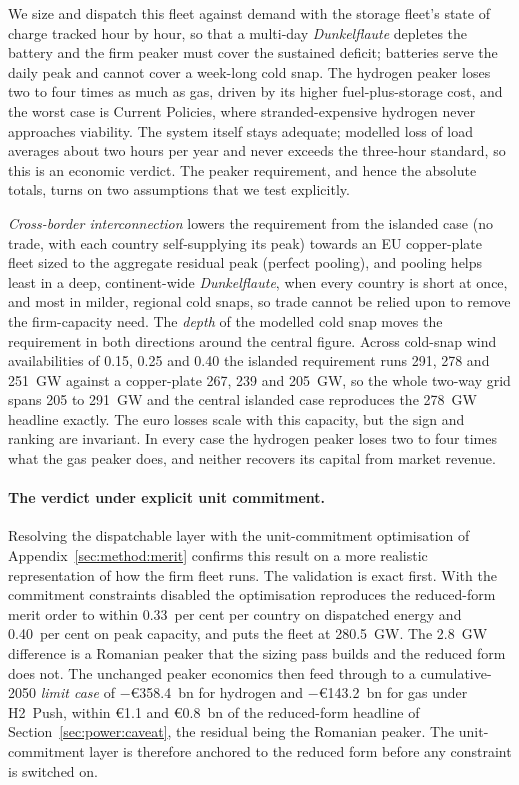 We size and dispatch this fleet against demand with the storage fleet's state of charge
tracked hour by hour, so that a multi-day \emph{Dunkelflaute} depletes the battery and
the firm peaker must cover the sustained deficit; batteries serve the daily peak and
cannot cover a week-long cold snap. The hydrogen peaker loses two to four times as much
as gas, driven by its higher fuel-plus-storage cost, and the worst case is Current
Policies, where stranded-expensive hydrogen never approaches viability. The system
itself stays adequate; modelled loss of load averages about two hours per year and never
exceeds the three-hour standard, so this is an economic verdict. The peaker requirement,
and hence the absolute totals, turns on two assumptions that we test explicitly.

\emph{Cross-border interconnection} lowers the requirement from the islanded case (no
trade, with each country self-supplying its peak) towards an EU copper-plate fleet sized
to the aggregate residual peak (perfect pooling), and pooling helps least in a deep,
continent-wide \emph{Dunkelflaute}, when every country is short at once, and most in
milder, regional cold snaps, so trade cannot be relied upon to remove the firm-capacity
need. The \emph{depth} of the modelled cold snap moves the requirement in both
directions around the central figure. Across cold-snap wind availabilities of 0.15, 0.25
and 0.40 the islanded requirement runs 291, 278 and 251~GW against a copper-plate 267,
239 and 205~GW, so the whole two-way grid spans 205 to 291~GW and the central islanded
case reproduces the 278~GW headline exactly. The euro losses scale with this capacity,
but the sign and ranking are invariant. In every case the hydrogen peaker loses two to
four times what the gas peaker does, and neither recovers its capital from market
revenue.

\paragraph{The verdict under explicit unit commitment.}
Resolving the dispatchable layer with the unit-commitment optimisation of
Appendix~\ref{sec:method:merit} confirms this result on a more realistic
representation of how the firm fleet runs. The validation is exact first. With the
commitment constraints disabled the optimisation reproduces the reduced-form merit
order to within 0.33~per cent per country on dispatched energy and 0.40~per cent on
peak capacity, and puts the fleet at 280.5~GW. The 2.8~GW difference is a Romanian peaker that the sizing pass builds and the reduced form does not. The unchanged peaker economics then feed through to a cumulative-2050 \emph{limit case}
of $-$\euro{}358.4~bn for hydrogen and $-$\euro{}143.2~bn for gas under H2~Push, within
\euro{}1.1 and \euro{}0.8~bn of the reduced-form headline of
Section~\ref{sec:power:caveat}, the residual being the Romanian peaker. The
unit-commitment layer is therefore anchored to the reduced form before any constraint is
switched on.

